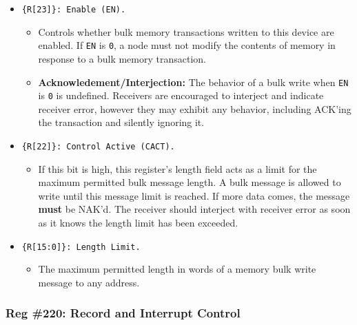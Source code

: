 \begin{itemize}
  \item {\tt \{R[23]\}: Enable (EN).}
    \begin{itemize}
      \item Controls whether bulk memory transactions written to this device
        are enabled. If {\tt EN} is {\tt 0}, a node must not modify the
        contents of memory in response to a bulk memory transaction.
      \item {\bf Acknowledement/Interjection:} The behavior of a bulk write
        when {\tt EN} is {\tt 0} is undefined. Receivers are encouraged to
        interject and indicate receiver error, however they may exhibit any
        behavior, including ACK'ing the transaction and silently ignoring it.
    \end{itemize}
  \item {\tt \{R[22]\}: Control Active (CACT).}
    \begin{itemize}
      \item If this bit is high, this register's length field acts as a limit
        for the maximum permitted bulk message length. A bulk message is
        allowed to write until this message limit is reached. If more data
        comes, the message {\bf must} be NAK'd. The receiver should interject
        with receiver error as soon as it knows the length limit has been
        exceeded.
    \end{itemize}
  \item {\tt \{R[15:0]\}: Length Limit.}
    \begin{itemize}
      \item The maximum permitted length in words of a memory bulk write
        message to any address.
    \end{itemize}
\end{itemize}

\subsubsection{Reg \#220: \proto Record and Interrupt Control}
\label{cmd:conf-proto-int}

